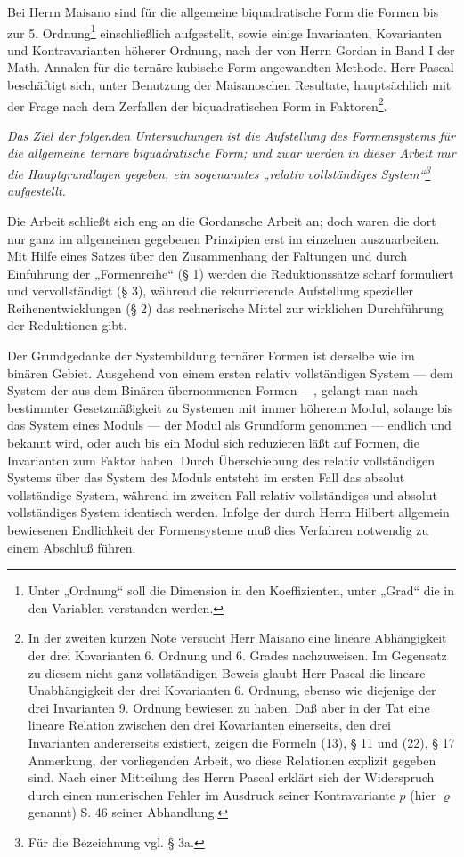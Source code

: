 \documentclass[11pt]{article}
\begin{document}
Bei Herrn Maisano sind für die allgemeine biquadratische Form die Formen bis zur 5. Ordnung\footnote{Unter „Ordnung“ soll die Dimension in den Koeffizienten, unter „Grad“ die in den Variablen verstanden werden.} einschließlich aufgestellt, sowie einige Invarianten, Kovarianten und Kontravarianten höherer Ordnung, nach der von Herrn Gordan in Band I der Math. Annalen für die ternäre kubische Form angewandten Methode. Herr Pascal beschäftigt sich, unter Benutzung der Maisanoschen Resultate, hauptsächlich mit der Frage nach dem Zerfallen der biquadratischen Form in Faktoren\footnote{In der zweiten kurzen Note versucht Herr Maisano eine lineare Abhängigkeit der drei Kovarianten 6. Ordnung und 6. Grades nachzuweisen. Im Gegensatz zu diesem nicht ganz vollständigen Beweis glaubt Herr Pascal die lineare Unabhängigkeit der drei Kovarianten 6. Ordnung, ebenso wie diejenige der drei Invarianten 9. Ordnung bewiesen zu haben. Daß aber in der Tat eine lineare Relation zwischen den drei Kovarianten einerseits, den drei Invarianten andererseits existiert, zeigen die Formeln (13), § 11 und (22), § 17 Anmerkung, der vorliegenden Arbeit, wo diese Relationen explizit gegeben sind. Nach einer Mitteilung des Herrn Pascal erklärt sich der Widerspruch durch einen numerischen Fehler im Ausdruck seiner Kontravariante $p$ (hier $\varrho$ genannt) S. 46 seiner Abhandlung.}.

\emph{Das Ziel der folgenden Untersuchungen ist die Aufstellung des Formensystems für die allgemeine ternäre biquadratische Form; und zwar werden in dieser Arbeit nur die Hauptgrundlagen gegeben, ein sogenanntes „relativ vollständiges System“\footnote{Für die Bezeichnung vgl. § 3a.} aufgestellt.}

Die Arbeit schließt sich eng an die Gordansche Arbeit an; doch waren die dort nur ganz im allgemeinen gegebenen Prinzipien erst im einzelnen auszuarbeiten. Mit Hilfe eines Satzes über den Zusammenhang der Faltungen und durch Einführung der „Formenreihe“ (§ 1) werden die Reduktionssätze scharf formuliert und vervollständigt (§ 3), während die rekurrierende Aufstellung spezieller Reihenentwicklungen (§ 2) das rechnerische Mittel zur wirklichen Durchführung der Reduktionen gibt.

Der Grundgedanke der Systembildung ternärer Formen ist derselbe wie im binären Gebiet. Ausgehend von einem ersten relativ vollständigen System --- dem System der aus dem Binären übernommenen Formen ---, gelangt man nach bestimmter Gesetzmäßigkeit zu Systemen mit immer höherem Modul, solange bis das System eines Moduls --- der Modul als Grundform genommen --- endlich und bekannt wird, oder auch bis ein Modul sich reduzieren läßt auf Formen, die Invarianten zum Faktor haben. Durch Überschiebung des relativ vollständigen Systems über das System des Moduls entsteht im ersten Fall das absolut vollständige System, während im zweiten Fall relativ vollständiges und absolut vollständiges System identisch werden. Infolge der durch Herrn Hilbert allgemein bewiesenen Endlichkeit der Formensysteme muß dies Verfahren notwendig zu einem Abschluß führen.
\end{document}
